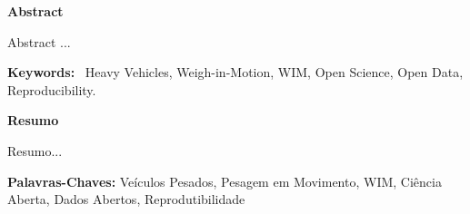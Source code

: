 \documentclass[a4paper]{article}
\newcommand\textstyletablecaptionCar[1]{\foreignlanguage{english}{\textbf{#1}}}
\begin{document}
\bigskip


\bigskip

{\bfseries
Abstract
}

{

Abstract ...
}


\bigskip


{
\textstyletablecaptionCar{Keywords:} \ Heavy
Vehicles, Weigh-in-Motion, WIM, Open Science, Open Data, Reproducibility.}


\bigskip

{\bfseries
\foreignlanguage{portuguese}{Resumo}}

{
\foreignlanguage{portuguese}{
Resumo...
}}


\bigskip

{
\textstyletablecaptionCar{\foreignlanguage{portuguese}{Palavras-Chaves:}}\foreignlanguage{portuguese}{
Veículos Pesados, Pesagem em Movimento, WIM, Ciência Aberta, Dados Abertos, Reprodutibilidade}}

\newpage
\end{document}
